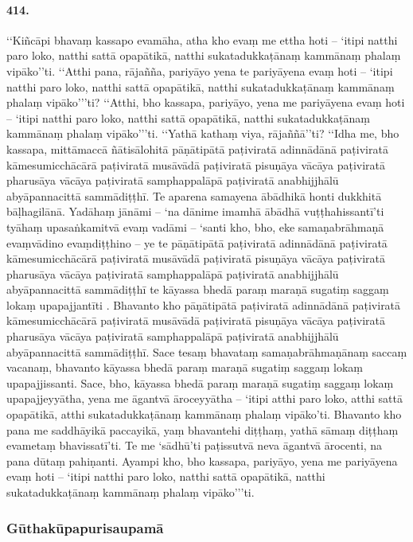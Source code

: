 \paragraph{414.} ‘‘Kiñcāpi bhavaṃ kassapo evamāha, atha kho evaṃ me ettha hoti – ‘itipi natthi paro loko, natthi sattā opapātikā, natthi sukatadukkaṭānaṃ kammānaṃ phalaṃ vipāko’’ti. ‘‘Atthi pana, rājañña, pariyāyo yena te pariyāyena evaṃ hoti – ‘itipi natthi paro loko, natthi sattā opapātikā, natthi sukatadukkaṭānaṃ kammānaṃ phalaṃ vipāko’’’ti? ‘‘Atthi, bho kassapa, pariyāyo, yena me pariyāyena evaṃ hoti – ‘itipi natthi paro loko, natthi sattā opapātikā, natthi sukatadukkaṭānaṃ kammānaṃ phalaṃ vipāko’’’ti. ‘‘Yathā kathaṃ viya, rājaññā’’ti? ‘‘Idha me, bho kassapa, mittāmaccā ñātisālohitā pāṇātipātā paṭiviratā adinnādānā paṭiviratā kāmesumicchācārā paṭiviratā musāvādā paṭiviratā pisuṇāya vācāya paṭiviratā pharusāya vācāya paṭiviratā samphappalāpā paṭiviratā anabhijjhālū abyāpannacittā sammādiṭṭhī. Te aparena samayena ābādhikā honti dukkhitā bāḷhagilānā. Yadāhaṃ jānāmi – ‘na dānime imamhā ābādhā vuṭṭhahissantī’ti tyāhaṃ upasaṅkamitvā evaṃ vadāmi – ‘santi kho, bho, eke samaṇabrāhmaṇā evaṃvādino evaṃdiṭṭhino – ye te pāṇātipātā paṭiviratā adinnādānā paṭiviratā kāmesumicchācārā paṭiviratā musāvādā paṭiviratā pisuṇāya vācāya paṭiviratā pharusāya vācāya paṭiviratā samphappalāpā paṭiviratā anabhijjhālū abyāpannacittā sammādiṭṭhī te kāyassa bhedā paraṃ maraṇā sugatiṃ saggaṃ lokaṃ upapajjantīti . Bhavanto kho pāṇātipātā paṭiviratā adinnādānā paṭiviratā kāmesumicchācārā paṭiviratā musāvādā paṭiviratā pisuṇāya vācāya paṭiviratā pharusāya vācāya paṭiviratā samphappalāpā paṭiviratā anabhijjhālū abyāpannacittā sammādiṭṭhī. Sace tesaṃ bhavataṃ samaṇabrāhmaṇānaṃ saccaṃ vacanaṃ, bhavanto kāyassa bhedā paraṃ maraṇā sugatiṃ saggaṃ lokaṃ upapajjissanti. Sace, bho, kāyassa bhedā paraṃ maraṇā sugatiṃ saggaṃ lokaṃ upapajjeyyātha, yena me āgantvā āroceyyātha – ‘itipi atthi paro loko, atthi sattā opapātikā, atthi sukatadukkaṭānaṃ kammānaṃ phalaṃ vipāko’ti. Bhavanto kho pana me saddhāyikā paccayikā, yaṃ bhavantehi diṭṭhaṃ, yathā sāmaṃ diṭṭhaṃ evametaṃ bhavissatī’ti. Te me ‘sādhū’ti paṭissutvā neva āgantvā ārocenti, na pana dūtaṃ pahiṇanti. Ayampi kho, bho kassapa, pariyāyo, yena me pariyāyena evaṃ hoti – ‘itipi natthi paro loko, natthi sattā opapātikā, natthi sukatadukkaṭānaṃ kammānaṃ phalaṃ vipāko’’’ti.

\subsubsection{Gūthakūpapurisaupamā}


